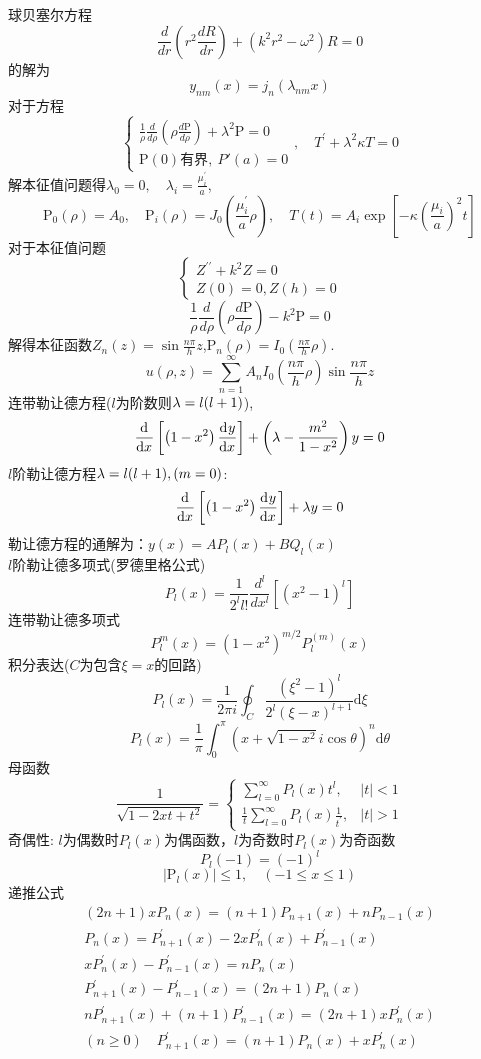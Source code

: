 \documentclass[UTF8,9pt]{ctexart}
\begin{document}
球贝塞尔方程$$ 
\frac{d}{d r}\left(r^{2} \frac{d R}{d r}\right)+\left(k^{2} r^{2}-\omega^{2}\right) R=0
$$的解为$$ 
y_{n m}(x)=j_{n}\left(\lambda_{n m} x\right)
$$
对于方程$$ 
\left\{\begin{array}{l}{\frac{1}{\rho} \frac{d}{d \rho}\left(\rho \frac{d \mathrm{P}}{d \rho}\right)+\lambda^{2} \mathrm{P}=0} \\ {\mathrm{P}(0)\text{有界},\ P'(a)=0}\end{array}\right.,\quad T^{\prime}+\lambda^{2} \kappa T=0
$$
解本征值问题得$\lambda_{0}=0, \quad \lambda_{i}=\frac{\mu_{i}^{\prime}}{a}$,
$$ 
\mathrm{P}_{0}(\rho)=A_{0}, \quad \mathrm{P}_{i}(\rho)=J_{0}\left(\frac{\mu_{i}^{\prime}}{a} \rho\right),\quad T(t)=A_{i} \exp \left[-\kappa\left(\frac{\mu_{i}}{a}\right)^{2} t\right]
$$
对于本征值问题$$ 
\left\{\begin{array}{l}{Z^{\prime \prime}+k^{2} Z=0} \\ {Z(0)=0, Z(h)=0}\end{array}\right.
$$$$ 
\frac{1}{\rho} \frac{d}{d \rho}\left(\rho \frac{d \mathrm{P}}{d \rho}\right)-k^{2} \mathrm{P}=0
$$
解得本征函数$Z_{n}(z)=\sin \frac{n \pi}{h} z$,$\mathrm{P}_{n}(\rho)=I_{0}\left(\frac{n \pi}{h} \rho\right)$.$$ 
u(\rho, z)=\sum_{n=1}^{\infty} A_{n} I_{0}\left(\frac{n \pi}{h} \rho\right) \sin \frac{n \pi}{h} z
$$
连带勒让德方程($l$为阶数则$\lambda=l(l+1)$),$$ 
\frac{\mathrm{d}^{} }{\mathrm{d} {x}^{}}\left[\left(1-x^{2}\right) \frac{\mathrm{d}^{} y}{\mathrm{d} {x}^{}}\right]+\left(\lambda-\frac{m^{2}}{1-x^{2}}\right) y=0
$$
$l$阶勒让德方程$\lambda=l(l+1),(m=0)$:$$ 
\frac{\mathrm{d}^{} }{\mathrm{d} {x}^{}}\left[\left(1-x^{2}\right) \frac{\mathrm{d}^{} y}{\mathrm{d} {x}^{}}\right]+\lambda  y=0
$$勒让德方程的通解为：$y(x)=A P_{l}(x)+B Q_{l}(x)$\\
$l$阶勒让德多项式(罗德里格公式)$$P_{l}(x)=\frac{1}{2^{l} l !} \frac{d^{l}}{d x^{l}}[\left(x^{2}-1\right)^{l}]$$
连带勒让德多项式$$P_l^m(x)=(1-x^2)^{m/2}P_l^{(m)}(x)$$
积分表达($C$为包含$\xi=x$的回路)
$$ 
P_{l}(x)=\frac{1}{2 \pi i}\oint_C\frac{\left(\xi^{2}-1\right)^{l}}{2^{l}(\xi-x)^{l+1}} \mathrm{d} \xi
$$
$$ 
P_{l}(x)=\frac{1}{\pi} \int_{0}^{\pi}\left(x+\sqrt{1-x^{2}} i \cos \theta\right)^{n} \mathrm{d} \theta
$$
母函数
$$ 
\frac{1}{\sqrt{1-2 x t+t^{2}}}=\left\{\begin{array}{ll}{\sum_{l=0}^{\infty} P_{l}(x) t^{l},} & {|t|<1} \\ {\frac{1}{t} \sum_{l=0}^{\infty} P_{l}(x) \frac{1}{t^{\prime}},} & {|t|>1}\end{array}\right.
$$
奇偶性: $l$为偶数时$P_l(x)$为偶函数，$l$为奇数时$P_l(x)$为奇函数
$$P_{l}(-1)=(-1)^{l}$$
$$ 
\left|\mathrm{P}_{l}(x)\right| \leq 1, \quad(-1 \leq x \leq 1)
$$递推公式$$ 
\begin{array}{l}{(2 n+1) x P_{n}(x)=(n+1) P_{n+1}(x)+n P_{n-1}(x)} \\ {P_{n}(x)=P_{n+1}^{\prime}(x)-2 x P_{n}^{\prime}(x)+P_{n-1}^{\prime}(x)} \\ {x P_{n}^{\prime}(x)-P_{n-1}^{\prime}(x)=n P_{n}(x)} \\ {P_{n+1}^{\prime}(x)-P_{n-1}^{\prime}(x)=(2 n+1) P_{n}(x)} \\ {n P_{n+1}^{\prime}(x)+(n+1) P_{n-1}^{\prime}(x)=(2 n+1) x P_{n}^{\prime}(x)} \\ {(n \geq 0) \quad P_{n+1}^{\prime}(x)=(n+1) P_{n}(x)+x P_{n}^{\prime}(x)}\end{array}
$$
\end{document}
